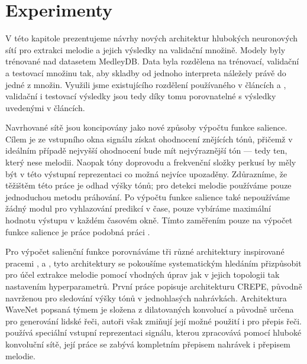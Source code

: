 \chapter{Experimenty}\label{experimenty}

V této kapitole prezentujeme návrhy nových architektur hlubokých neuronových sítí pro extrakci melodie a jejich výsledky na validační množině. Modely byly trénované nad datasetem MedleyDB. Data byla rozdělena na trénovací, validační a testovací množinu tak, aby skladby od jednoho interpreta náležely právě do jedné z množin. Využili jsme existujícího rozdělení používaného v článcích \cite{Bittner2017} a \cite{DBasaranSEssid2018}, validační i testovací výsledky jsou tedy díky tomu porovnatelné s výsledky uvedenými v článcích.

Navrhované sítě jsou koncipovány jako nové způsoby výpočtu funkce salience. Cílem je ze vstupního okna signálu získat ohodnocení znějících tónů, přičemž v ideálním případě nejvyšší ohodnocení bude mít nejvýraznější tón --- tedy ten, který nese melodii. Naopak tóny doprovodu a frekvenční složky perkusí by měly být v této výstupní reprezentaci co možná nejvíce upozaděny. Zdůrazníme, že těžištěm této práce je odhad výšky tónů; pro detekci melodie používáme pouze jednoduchou metodu práhování. Po výpočtu funkce salience také nepoužíváme žádný modul pro vyhlazování predikcí v čase, pouze vybíráme maximální hodnotu výstupu v každém časovém okně. Tímto zaměřením pouze na výpočet funkce salience je práce podobná práci \cite{Bittner2017}.

Pro výpočet salienční funkce porovnáváme tři různé architektury inspirované pracemi \cite{Kim2018}, \cite{Oord2016} a \cite{Bittner2017}, tyto architektury se pokoušíme systematickým hledáním přizpůsobit pro účel extrakce melodie pomocí vhodných úprav jak v jejich topologii tak nastavením hyperparametrů. První práce popisuje architekturu CREPE, původně navrženou pro sledování výšky tónů v jednohlasých nahrávkách. Architektura WaveNet popsaná týmem \cite{Oord2016} je složena z dilatovaných konvolucí a původně určena pro generování lidské řeči, autoři však zmiňují její možné použití i pro přepis řeči. \cite{Bittner2017} používá speciální vstupní reprezentaci signálu, kterou zpracovává pomocí hluboké konvoluční sítě, její práce se zabývá kompletním přepisem nahrávek i přepisem melodie. 


